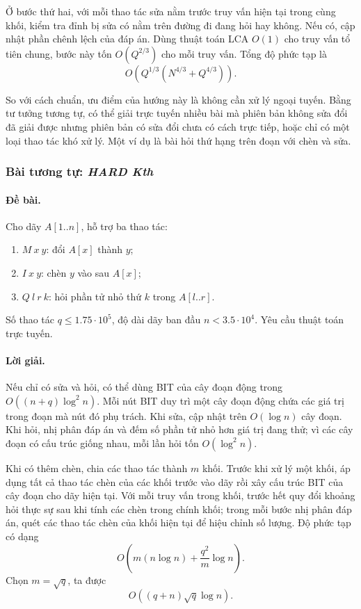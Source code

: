 \documentclass[11pt]{article}
\begin{document}
Ở bước thứ hai, với mỗi thao tác sửa nằm trước truy vấn hiện tại trong cùng
khối, kiểm tra đỉnh bị sửa có nằm trên đường đi đang hỏi hay không. Nếu có,
cập nhật phần chênh lệch của đáp án. Dùng thuật toán LCA \(O(1)\) cho truy
vấn tổ tiên chung, bước này tốn \(O(Q^{2/3})\) cho mỗi truy vấn. Tổng độ phức
tạp là
\[
  O\left(Q^{1/3}(N^{4/3}+Q^{4/3})\right).
\]

So với cách chuẩn, ưu điểm của hướng này là không cần xử lý ngoại tuyến. Bằng
tư tưởng tương tự, có thể giải trực tuyến nhiều bài mà phiên bản không sửa
đổi đã giải được nhưng phiên bản có sửa đổi chưa có cách trực tiếp, hoặc chỉ
có một loại thao tác khó xử lý. Một ví dụ là bài hỏi thứ hạng trên đoạn với
chèn và sửa.

\subsubsection{Bài tương tự: \emph{HARD Kth}}

\paragraph{Đề bài.}
Cho dãy \(A[1..n]\), hỗ trợ ba thao tác:
\begin{enumerate}
  \item \(M\ x\ y\): đổi \(A[x]\) thành \(y\);
  \item \(I\ x\ y\): chèn \(y\) vào sau \(A[x]\);
  \item \(Q\ l\ r\ k\): hỏi phần tử nhỏ thứ \(k\) trong \(A[l..r]\).
\end{enumerate}
Số thao tác \(q\le 1.75\cdot 10^5\), độ dài dãy ban đầu
\(n<3.5\cdot 10^4\). Yêu cầu thuật toán trực tuyến.

\paragraph{Lời giải.}
Nếu chỉ có sửa và hỏi, có thể dùng BIT của cây đoạn động trong
\(O((n+q)\log^2 n)\). Mỗi nút BIT duy trì một cây đoạn động chứa các giá trị
trong đoạn mà nút đó phụ trách. Khi sửa, cập nhật trên \(O(\log n)\) cây
đoạn. Khi hỏi, nhị phân đáp án và đếm số phần tử nhỏ hơn giá trị đang thử;
vì các cây đoạn có cấu trúc giống nhau, mỗi lần hỏi tốn \(O(\log^2 n)\).

Khi có thêm chèn, chia các thao tác thành \(m\) khối. Trước khi xử lý một
khối, áp dụng tất cả thao tác chèn của các khối trước vào dãy rồi xây cấu
trúc BIT của cây đoạn cho dãy hiện tại. Với mỗi truy vấn trong khối, trước
hết quy đổi khoảng hỏi thực sự sau khi tính các chèn trong chính khối; trong
mỗi bước nhị phân đáp án, quét các thao tác chèn của khối hiện tại để hiệu
chỉnh số lượng. Độ phức tạp có dạng
\[
  O\left(m(n\log n)+\frac{q^2}{m}\log n\right).
\]
Chọn \(m=\sqrt q\), ta được
\[
  O((q+n)\sqrt q\log n).
\]
\end{document}
